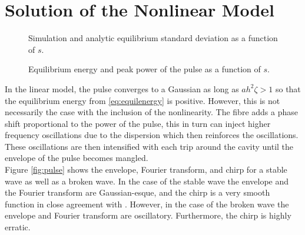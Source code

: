 
\chapter{Solution of the Nonlinear Model}

\begin{figure}[htbp]
\centering

\caption{Simulation and analytic equilibrium standard deviation as a function of $s$.}
\label{fig:}
\end{figure}



\begin{figure}[htbp]
\centering

\caption{Equilibrium energy and peak power of the pulse as a function of $s$.}
\label{fig:}
\end{figure}



\begin{figure}[htbp]
\centering

\caption{}
\label{fig:}
\end{figure}

\begin{figure}[htbp]
\centering

\caption{}
\label{fig:}
\end{figure}

\begin{figure}[htbp]
\centering

\caption{}
\label{fig:}
\end{figure}

\begin{figure}[htbp]
\centering

\caption{}
\label{fig:}
\end{figure}

In the linear model, the pulse converges to a Gaussian as long as $a h^2 \zeta > 1$ so that the equilibrium energy from \eqref{eq:equilenergy} is positive. However, this is not necessarily the case with the inclusion of the nonlinearity. The fibre adds a phase shift proportional to the power of the pulse, this in turn can inject higher frequency oscillations due to the dispersion which then reinforces the oscillations. These oscillations are then intensified with each trip around the cavity until the envelope of the pulse becomes mangled. \\

Figure \ref{fig:pulse} shows the envelope, Fourier transform, and chirp for a stable wave as well as a broken wave. In the case of the stable wave the envelope and the Fourier transform are Gaussian-esque, and the chirp is a very smooth function in close agreement with \cite{chen}. However, in the case of the broken wave the envelope and Fourier transform are oscillatory. Furthermore, the chirp is highly erratic. \\

